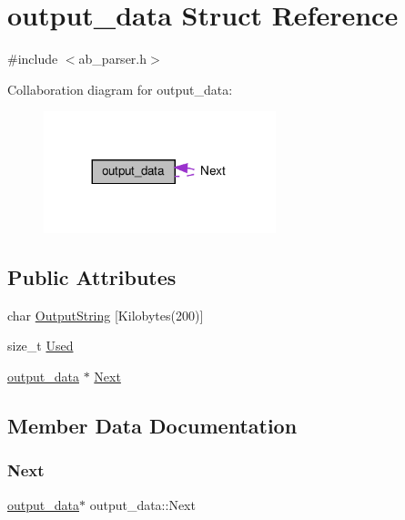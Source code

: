 \hypertarget{structoutput__data}{}\section{output\+\_\+data Struct Reference}
\label{structoutput__data}


{\ttfamily \#include $<$ab\+\_\+parser.\+h$>$}



Collaboration diagram for output\+\_\+data\+:
\nopagebreak
\begin{figure}[H]
\begin{center}
\leavevmode
\includegraphics[width=191pt]{dc/d66/structoutput__data__coll__graph}
\end{center}
\end{figure}
\subsection*{Public Attributes}
\begin{DoxyCompactItemize}
\item 
char \hyperlink{structoutput__data_a4b5cddf8fc02cfb5219eafd71e3b3645}{Output\+String} \mbox{[}Kilobytes(200)\mbox{]}
\item 
size\+\_\+t \hyperlink{structoutput__data_ac960304f0c5df1d42068abe8bb6a362a}{Used}
\item 
\hyperlink{structoutput__data}{output\+\_\+data} $\ast$ \hyperlink{structoutput__data_ab48e74baa16f37fe4f5b87faed472657}{Next}
\end{DoxyCompactItemize}


\subsection{Member Data Documentation}
\mbox{\label{structoutput__data_ab48e74baa16f37fe4f5b87faed472657}} 
\subsubsection{\texorpdfstring{Next}{Next}}
{\footnotesize\ttfamily \hyperlink{structoutput__data}{output\+\_\+data}$\ast$ output\+\_\+data\+::\+Next}

